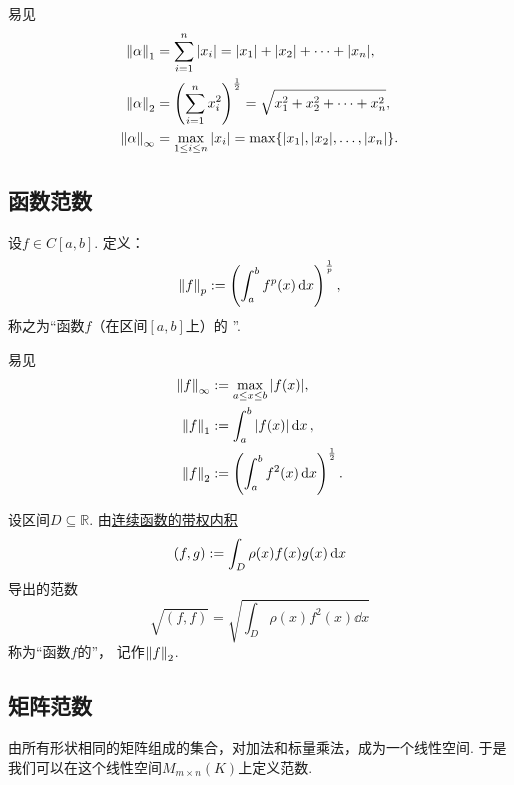 易见\begin{align}
	\norm{\alpha}_1
	&= \sum_{i=1}^n \abs{x_i}
	= \abs{x_1} + \abs{x_2} + \dotsb + \abs{x_n}, \\
	\norm{\alpha}_2
	&= \left( \sum_{i=1}^n x_i^2 \right)^{\frac12}
	= \sqrt{x_1^2 + x_2^2 + \dotsb + x_n^2}, \\
	\norm{\alpha}_\infty
	&= \max_{1 \leq i \leq n} \abs{x_i}
	= \max\{\abs{x_1},\abs{x_2},\dotsc,\abs{x_n}\}.
\end{align}

\subsection{函数范数}
\begin{definition}%
设\(f \in C[a,b]\).
定义：\begin{equation}
	\norm{f}_p
	:=
	\left( \int_a^b f^p(x) \dd{x} \right)^{\frac1p},
\end{equation}
称之为“函数\(f\)（在区间\([a,b]\)上）的 ”.
\end{definition}

易见\begin{align}
	\norm{f}_\infty
	&:=
	\max_{a \leq x \leq b} \abs{f(x)}, \\
	\norm{f}_1
	&:=
	\int_a^b \abs{f(x)} \dd{x}, \\
	\norm{f}_2
	&:=
	\left( \int_a^b f^2(x) \dd{x} \right)^{\frac12}.
\end{align}

\begin{definition}\label{definition:范数.连续函数的带权范数}
设区间\(D \subseteq \mathbb{R}\).
由\hyperref[definition:欧几里得空间.连续函数的带权内积]{连续函数的带权内积}
\begin{equation*}
	(f,g)
	:=
	\int_D \rho(x) f(x) g(x) \dd{x}
\end{equation*}
导出的范数\begin{equation*}
	\sqrt{(f,f)}
	= \sqrt{
		\int_D \rho(x) f^2(x) \dd{x}
	}
\end{equation*}
称为“函数\(f\)的”，
记作\(\norm{f}_2\).
\end{definition}

\subsection{矩阵范数}
由所有形状相同的矩阵组成的集合，对加法和标量乘法，成为一个线性空间.
于是我们可以在这个线性空间\(M_{m \times n}(K)\)上定义范数.


